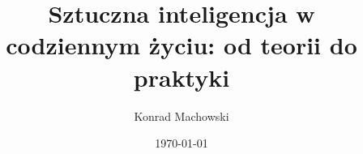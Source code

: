 \documentclass{beamer}
\title{Sztuczna inteligencja w codziennym życiu: od teorii do praktyki}
\author{Konrad Machowski}
\date{\today}
\begin{document}
\frame{\titlepage}








\end{document}
